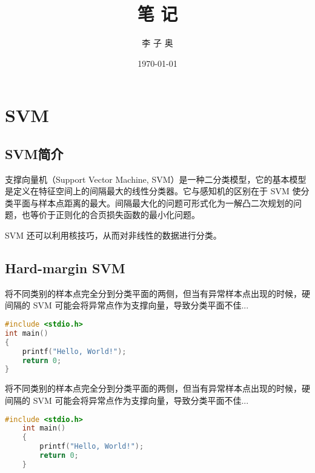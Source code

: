 \documentclass[forprint]{report}
\title{笔 记} %
\author{李 子 奥} %
\date{\today} %
\begin{document}
\maketitle
\frontmatter
{}              %

\tableofcontents
\thispagestyle{empty}				%

\mainmatter %
\baselineskip=23pt  %

\chapter{SVM}

\section{SVM简介}

支撑向量机（Support Vector Machine, SVM）是一种二分类模型\cite{r3}，它的基本模型是定义在特征空间上的间隔最大的线性分类器。它与感知机的区别在于 SVM 使分类平面与样本点距离的最大。间隔最大化的问题可形式化为一解凸二次规划的问题，也等价于正则化的合页损失函数的最小化问题。


SVM 还可以利用核技巧，从而对非线性的数据进行分类。

\section{Hard-margin SVM}

将不同类别的样本点完全分到分类平面的两侧，但当有异常样本点出现的时候，硬间隔的 SVM 可能会将异常点作为支撑向量，导致分类平面不佳\cite{r1}...

\begin{lstlisting}[language=c]
#include <stdio.h>
int main()
{
	printf("Hello, World!");
	return 0;
}
\end{lstlisting}

将不同类别的样本点完全分到分类平面的两侧，但当有异常样本点出现的时候，硬间隔的 SVM 可能会将异常点作为支撑向量，导致分类平面不佳\cite{r1}...

\begin{lstlisting}[language=c]
	#include <stdio.h>
	int main()
	{
		printf("Hello, World!");
		return 0;
	}
\end{lstlisting}
\end{document}
